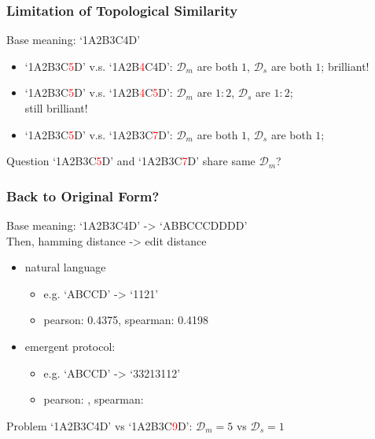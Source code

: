 \documentclass[compress,mathserif,xcolor=dvipsnames,svgnames,aspectratio=43]{beamer}
\begin{document}
\begin{frame}[c]
  \frametitle{Limitation of Topological Similarity}
  Base meaning: `1A2B3C4D'
  
  \begin{itemize}
    \item `1A2B3C\textcolor{red}{5}D' v.s. `1A2B\textcolor{red}{4}C4D': $\mathcal{D}_m$ are both $1$, $\mathcal{D}_s$ are both $1$; brilliant!
    \item `1A2B3C\textcolor{red}{5}D' v.s. `1A2B\textcolor{red}{4}C\textcolor{red}{5}D': $\mathcal{D}_m$ are $1:2$, $\mathcal{D}_s$ are $1:2$; \\still brilliant!
    \pause
    \item `1A2B3C\textcolor{red}{5}D' v.s. `1A2B3C\textcolor{red}{7}D': $\mathcal{D}_m$ are both $1$, $\mathcal{D}_s$ are both $1$;
  \end{itemize}

  \pause
  \begin{block}{Question}
    `1A2B3C\textcolor{red}{5}D' and `1A2B3C\textcolor{red}{7}D' share same $\mathcal{D}_m$?
  \end{block}

\end{frame}

\begin{frame}[c]
  \frametitle{Back to Original Form?}
  Base meaning: `1A2B3C4D' -> `ABBCCCDDDD' \\
  Then, hamming distance -> edit distance
  \begin{itemize}
    \item natural language
      \begin{itemize}
        \item e.g. `ABCCD' -> `1121'
        \item pearson: 0.4375, spearman: 0.4198
      \end{itemize}
    \item emergent protocol:
    \begin{itemize}
      \item e.g. `ABCCD' -> `33213112'
      \item pearson: , spearman:
    \end{itemize}
  \end{itemize}

  \begin{block}{Problem}
    `1A2B3C4D' vs `1A2B3C\textcolor{red}{9}D': $\mathcal{D}_m = 5$ vs $\mathcal{D}_s = 1$
  \end{block}
\end{frame}
\end{document}

